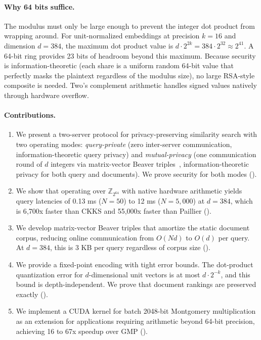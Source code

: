 \documentclass[11pt]{article}
\newcommand{\Z}{\mathbb{Z}}
\begin{document}
\paragraph{Why 64 bits suffice.} The modulus must only be large enough to prevent the integer dot product from wrapping around. For unit-normalized embeddings at precision $k = 16$ and dimension $d = 384$, the maximum dot product value is $d \cdot 2^{2k} = 384 \cdot 2^{32} \approx 2^{41}$. A 64-bit ring provides 23 bits of headroom beyond this maximum. Because security is information-theoretic (each share is a uniform random 64-bit value that perfectly masks the plaintext regardless of the modulus size), no large RSA-style composite is needed. Two's complement arithmetic handles signed values natively through hardware overflow.

\paragraph{Contributions.}
\begin{enumerate}[leftmargin=*]
\item We present a two-server protocol for privacy-preserving similarity search with two operating modes: \emph{query-private} (zero inter-server communication, information-theoretic query privacy) and \emph{mutual-privacy} (one communication round of $d$ integers via matrix-vector Beaver triples~\cite{beaver1991efficient}, information-theoretic privacy for both query and documents). We prove security for both modes ().

\item We show that operating over $\Z_{2^{64}}$ with native hardware arithmetic yields query latencies of 0.13 ms ($N = 50$) to 12 ms ($N = 5{,}000$) at $d = 384$, which is 6{,}700x faster than CKKS and 55{,}000x faster than Paillier ().

\item We develop matrix-vector Beaver triples that amortize the static document corpus, reducing online communication from $O(Nd)$ to $O(d)$ per query. At $d = 384$, this is 3 KB per query regardless of corpus size ().

\item We provide a fixed-point encoding with tight error bounds. The dot-product quantization error for $d$-dimensional unit vectors is at most $d \cdot 2^{-k}$, and this bound is depth-independent. We prove that document rankings are preserved exactly ().

\item We implement a CUDA kernel for batch 2048-bit Montgomery multiplication as an extension for applications requiring arithmetic beyond 64-bit precision, achieving 16 to 67x speedup over GMP ().
\end{enumerate}
\end{document}
